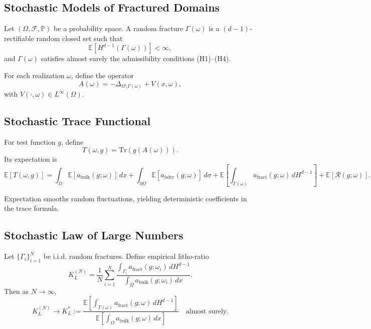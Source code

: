 \subsection{Stochastic Models of Fractured Domains}

\begin{definition}
Let $(\Omega, \mathcal{F}, \mathbb{P})$ be a probability space.  
A random fracture $\Gamma(\omega)$ is a $(d-1)$-rectifiable random closed set such that 
\[
\mathbb{E}[H^{d-1}(\Gamma(\omega))] < \infty, 
\]
and $\Gamma(\omega)$ satisfies almost surely the admissibility conditions (H1)–(H4). 
\end{definition}

\begin{definition}
For each realization $\omega$, define the operator
\[
A(\omega) = -\Delta_{\Omega\setminus \Gamma(\omega)} + V(x,\omega),
\]
with $V(\cdot,\omega) \in L^\infty(\Omega)$. 
\end{definition}

\subsection{Stochastic Trace Functional}

\begin{definition}
For test function $g$, define
\[
T(\omega,g) = \mathrm{Tr}(g(A(\omega))). 
\]
Its expectation is
\[
\mathbb{E}[T(\omega,g)] = \int_\Omega \mathbb{E}[a_{\mathrm{bulk}}(g;\omega)]\,dx 
+ \int_{\partial \Omega} \mathbb{E}[a_{\mathrm{bdry}}(g;\omega)]\,d\sigma 
+ \mathbb{E}\!\left[\int_{\Gamma(\omega)} a_{\mathrm{fract}}(g;\omega)\,dH^{d-1}\right]
+ \mathbb{E}[\mathcal{R}(g;\omega)].
\]
\end{definition}

\begin{remark}
Expectation smooths random fluctuations, yielding deterministic coefficients in the trace formula. 
\end{remark}

\subsection{Stochastic Law of Large Numbers}

\begin{theorem}
\label{thm:lln-kl}
Let $\{ \Gamma_i \}_{i=1}^N$ be i.i.d. random fractures.  
Define empirical litho-ratio
\[
K_L^{(N)} = \frac{1}{N} \sum_{i=1}^N \frac{\int_{\Gamma_i} a_{\mathrm{fract}}(g;\omega_i)\,dH^{d-1}}{\int_\Omega a_{\mathrm{bulk}}(g;\omega_i)\,dx}.
\]
Then as $N \to \infty$,
\[
K_L^{(N)} \to K_L^* := \frac{\mathbb{E}\!\left[\int_{\Gamma(\omega)} a_{\mathrm{fract}}(g;\omega)\,dH^{d-1}\right]}{\mathbb{E}\!\left[\int_\Omega a_{\mathrm{bulk}}(g;\omega)\,dx\right]} \quad \text{almost surely}.
\]
\end{theorem}


